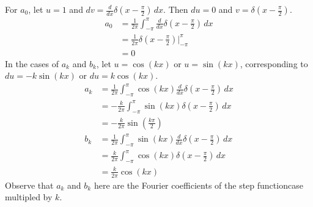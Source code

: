 \documentclass[a4paper]{article}
\begin{document}
For \( a_{0} \), let \( u = 1 \) and \( dv = \displaystyle{\frac{d }{d x} \delta\!\left( x - \frac{\pi}{2} \right)} \, dx \). Then \( du = 0 \) and \( v = \displaystyle{\delta\!\left( x - \frac{\pi}{2} \right)} \).
\begin{align*}
	a_{0} & = \frac{1}{2 \pi} \int^{\pi}_{-\pi} \frac{d }{d x} \delta \!\left( x - \frac{\pi}{2} \right) \, dx \\
	      & = \frac{1}{2 \pi} \delta \!\left( x - \frac{\pi}{2} \right) \Big|^{\pi}_{-\pi} \\ 
	      & = 0
\end{align*}
In the cases of \( a_{k} \) and \( b_{k} \), let \( u = \cos\!\left(kx\right) \) or \( u = \sin\!\left(kx\right) \), corresponding to \( du = -k \sin\!\left(kx\right) \) or \( du = k \cos\!\left(kx\right) \).
\begin{align*}
	a_{k} & = \frac{1}{2 \pi} \int^{\pi}_{-\pi} \cos\!\left(kx\right) \frac{d }{d x} \delta\!\left( x - \frac{\pi}{2} \right) \, dx \\
	 & = -\frac{k}{2 \pi} \int^{\pi}_{-\pi} \sin\!\left(kx\right) \delta\!\left( x - \frac{\pi}{2} \right) \, dx \\
	 & = -\frac{k}{2 \pi} \sin\!\left(\frac{k \pi}{2}\right) \\
	b_{k} & = \frac{1}{2 \pi} \int^{\pi}_{-\pi} \sin\!\left(kx\right) \frac{d }{d x} \delta\!\left( x - \frac{\pi}{2} \right) \, dx \\
	      & = \frac{k}{2 \pi} \int^{\pi}_{-\pi} \cos\!\left(kx\right) \delta\!\left( x - \frac{\pi}{2} \right) \, dx \\
	      & = \frac{k}{2 \pi} \cos\!\left(kx\right) 
\end{align*}
Observe that \( a_{k} \) and \( b_{k} \) here are the Fourier coefficients of the step functioncase multipled by \( k \).

\vspace{12pt}

\end{document}
